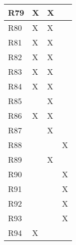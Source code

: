 \documentclass{article}
\begin{document}
\begin{tabular}{|l|l|l|l|}
R79 &X&X& \\\hline
R80 &X&X& \\\hline
R81 &X&X& \\\hline
R82 &X&X& \\\hline
R83 &X&X& \\\hline
R84 &X&X& \\\hline
R85 &&X& \\\hline
R86 &X&X& \\\hline
R87 &&X& \\\hline
R88 &&&X \\\hline
R89 &&X& \\\hline
R90 &&&X \\\hline
R91 &&&X \\\hline
R92 &&&X \\\hline
R93 &&&X \\\hline
R94 &X&& \\\hline
\end{tabular}
\newpage
\end{document}
